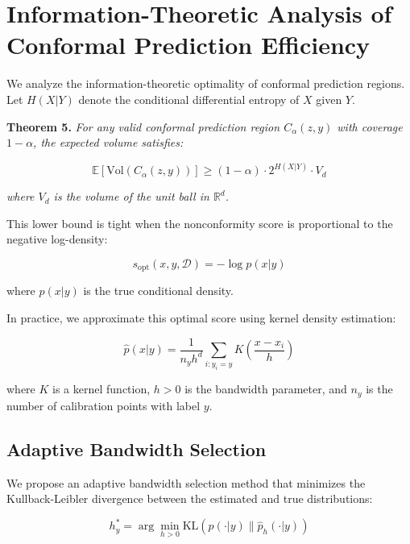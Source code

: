 \documentclass{article}
\theoremstyle{plain}
\theoremstyle{definition}
\theoremstyle{remark}
\begin{document}
\section{Information-Theoretic Analysis of Conformal Prediction Efficiency}

We analyze the information-theoretic optimality of conformal prediction regions. Let $H(X|Y)$ denote the conditional differential entropy of $X$ given $Y$.

\textbf{Theorem 5.} \textit{For any valid conformal prediction region $C_{\alpha}(z, y)$ with coverage $1-\alpha$, the expected volume satisfies:}

\begin{equation}
\mathbb{E}[\text{Vol}(C_{\alpha}(z, y))] \geq (1-\alpha) \cdot 2^{H(X|Y)} \cdot V_d
\end{equation}

\textit{where $V_d$ is the volume of the unit ball in $\mathbb{R}^d$.}

This lower bound is tight when the nonconformity score is proportional to the negative log-density:

\begin{equation}
s_{\text{opt}}(x, y, \mathcal{D}) = -\log p(x|y)
\end{equation}

where $p(x|y)$ is the true conditional density.

In practice, we approximate this optimal score using kernel density estimation:

\begin{equation}
\hat{p}(x|y) = \frac{1}{n_y h^d} \sum_{i: y_i = y} K\left(\frac{x - x_i}{h}\right)
\end{equation}

where $K$ is a kernel function, $h > 0$ is the bandwidth parameter, and $n_y$ is the number of calibration points with label $y$.

\subsection{Adaptive Bandwidth Selection}

We propose an adaptive bandwidth selection method that minimizes the Kullback-Leibler divergence between the estimated and true distributions:

\begin{equation}
h^*_y = \arg\min_{h > 0} \text{KL}(p(\cdot|y) \parallel \hat{p}_h(\cdot|y))
\end{equation}
\end{document}
